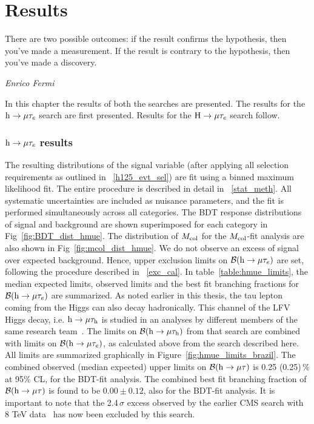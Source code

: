 
%
%

\chapter{Results}
\epigraph{There are two possible outcomes: if the result confirms the hypothesis, then you've made a measurement. If the result is contrary to the hypothesis, then you've made a discovery.}{\textit{Enrico Fermi}}
\label{results}
In this chapter the results of both the searches are presented. The results for the $\text{h} \to \mu \tau_{e}$ search are first presented. Results for the $\text{H} \to \mu \tau_{e}$ search follow.

\subsection{$\text{h} \to \mu \tau_{e}$ results}
The resulting distributions of the signal variable (after applying all selection requirements as outlined in ~\ref{h125_evt_sel}) are fit using a binned maximum likelihood fit. The entire procedure is described in detail in ~\ref{stat_meth}. All systematic uncertainties are included as nuisance parameters, and the fit is performed simultaneously across all categories. The BDT response distributions of signal and background are shown superimposed for each category in Fig~\ref{fig:BDT_dist_hmue}. The distribution of $M_{\text{col}}$ for the $M_{\text{col}}$-fit analysis are also shown in Fig~\ref{fig:mcol_dist_hmue}. We do not observe an excess of signal over expected background. Hence, upper exclusion limits on $\mathcal{B}(\text{h} \to \mu \tau_{e})$ are set, following the procedure described in ~\ref{exc_cal}. In table~\ref{table:hmue_limits}, the median expected limits, observed limits and the best fit branching fractions for $\mathcal{B}(\text{h} \to \mu \tau_{e})$ are summarized. As noted earlier in this thesis, the tau lepton coming from the Higgs can also decay hadronically. This channel of the LFV Higgs decay, i.e. $\text{h} \to \mu \tau_{\text{h}}$ is studied in an analyses by different members of the same research team~\cite{HIG-17-001}. The limits on $\mathcal{B}(\text{h} \to \mu \tau_{\text{h}})$ from that search are combined with limits on $\mathcal{B}(\text{h} \to \mu \tau_{e})$, as calculated above from the search described here. All limits are summarized graphically in Figure~\ref{fig:hmue_limits_brazil}. The combined observed (median expected) upper limits on $\mathcal{B}(\text{h} \to \mu \tau)$ is 0.25 (0.25)\,\% at 95\% CL, for the BDT-fit analysis. The combined best fit branching fraction of $\mathcal{B}(\text{h} \to \mu \tau)$ is found to be $0.00 \pm 0.12$, also for the BDT-fit analysis. It is important to note that the 2.4\,$\sigma$ excess observed by the earlier CMS search with 8 TeV data~\cite{Khachatryan:2015kon} has now been excluded by this search.


